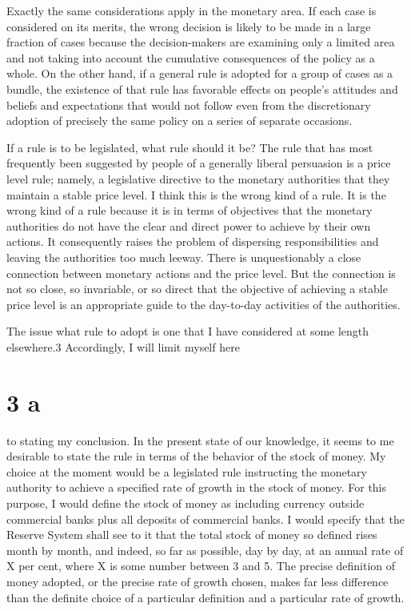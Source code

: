 \documentclass[11pt,openany]{book}
\newcommand{\booksection}[1]{%
  \phantomsection\section*{#1}%
  \addcontentsline{toc}{section}{#1}\markright{#1}}
\begin{document}
Exactly the same considerations apply in the monetary area. If each case is considered on its merits, the wrong decision is likely to be made in a large fraction of cases because the decision-makers are examining only a limited area and not taking into account the cumulative consequences of the policy as a whole. On the other hand, if a general rule is adopted for a group of cases as a bundle, the existence of that rule has favorable effects on people's attitudes and beliefs and expectations that would not follow even from the discretionary adoption of precisely the same policy on a series of separate occasions.

If a rule is to be legislated, what rule should it be? The rule that has most frequently been suggested by people of a generally liberal persuasion is a price level rule; namely, a legislative directive to the monetary authorities that they maintain a stable price level. I think this is the wrong kind of a rule. It is the wrong kind of a rule because it is in terms of objectives that the monetary authorities do not have the clear and direct power to achieve by their own actions. It consequently raises the problem of dispersing responsibilities and leaving the authorities too much leeway. There is unquestionably a close connection between monetary actions and the price level. But the connection is not so close, so invariable, or so direct that the objective of achieving a stable price level is an appropriate guide to the day-to-day activities of the authorities.

The issue what rule to adopt is one that I have considered at some length elsewhere.3 Accordingly, I will limit myself here

\booksection{3 a}

to stating my conclusion. In the present state of our knowledge, it seems to me desirable to state the rule in terms of the behavior of the stock of money. My choice at the moment would be a legislated rule instructing the monetary authority to achieve a specified rate of growth in the stock of money. For this purpose, I would define the stock of money as including currency outside commercial banks plus all deposits of commercial banks. I would specify that the Reserve System shall see to it that the total stock of money so defined rises month by month, and indeed, so far as possible, day by day, at an annual rate of X per cent, where X is some number between 3 and 5. The precise definition of money adopted, or the precise rate of growth chosen, makes far less difference than the definite choice of a particular definition and a particular rate of growth.
\end{document}

